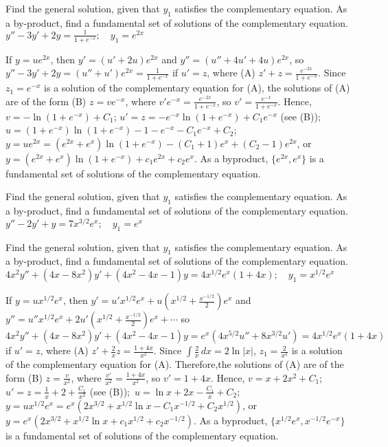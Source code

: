 \documentclass{ximera}
\begin{document}
\begin{problem}\label{exer:5.6.4}
Find the general solution,
given that $y_1$ satisfies the complementary equation. As a by-product,
find a fundamental set of solutions of the complementary equation. $y''-3y'+2y=\frac{1}{1+e^{-x}};   \quad y_1=e^{2x}$

\begin{solution}
    If $y=ue^{2x}$, then $y'=(u'+2u)e^{2x}$ and $y''=(u''+4u'+4u)e^{2x}$,
so $y''-3y'+2y=(u''+u')e^{2x}=\frac{1}{1+e^{-x}}$ if $u'=z$, where
(A) $z'+z=\frac{e^{-2x}}{1+e^{-x}}$. Since $z_1=e^{-x}$ is a
solution of the complementary equation for (A), the solutions of (A)
are of the form (B) $z=ve^{-x}$, where
$v'e^{-x}=\frac{e^{-2x}}{1+e^{-x}}$, so
$v'=\frac{e^{-x}}{1+e^{-x}}$. Hence, $v=-\ln(1+e^{-x})+C_1$;\;
$u'=z=-e^{-x}\ln(1+e^{-x})+C_1e^{-x}$ (see (B));\;
$u=(1+e^{-x})\ln(1+e^{-x})-1-e^{-x}-C_1e^{-x}+C_2$;\;
$y=ue^{2x}=(e^{2x}+e^x)\ln(1+e^{-x})-(C_1+1)e^x+(C_2-1)e^{2x}$, or
$y=(e^{2x}+e^x) \ln (1+e^{-x})+c_1e^{2x}+c_2e^x$. As a byproduct,
$\{e^{2x},e^x\}$ is a fundamental set of solutions of the
complementary equation.
\end{solution}
\end{problem}

\begin{problem}\label{exer:5.6.5}
Find the general solution,
given that $y_1$ satisfies the complementary equation. As a by-product,
find a fundamental set of solutions of the complementary equation. $y''-2y'+y=7x^{3/2}e^x;   \quad y_1=e^x$
\end{problem}

\begin{problem}\label{exer:5.6.6}
Find the general solution,
given that $y_1$ satisfies the complementary equation. As a by-product,
find a fundamental set of solutions of the complementary equation. $4x^2y''+(4x-8x^2)y'+(4x^2-4x-1)y=4x^{1/2}e^x(1+4x);   \quad
y_1=x^{1/2}e^x$

\begin{solution}
    If $y=ux^{1/2}e^x$, then
$y'=u'x^{1/2}e^x+u{\left(x^{1/2}+\frac{x^{-1/2}}{2}\right)}e^x$ and
$y''=u''x^{1/2}e^x+2u'{\left(x^{1/2}+\frac{x^{-1/2}}{2}\right)}e^x+\cdots$
so $4x^2y''+(4x-8x^2)y'+(4x^2-4x-1)y=e^x(4x^{5/2}u''+8x^{3/2}u')
=4x^{1/2}e^x(1+4x)$ if $u'=z$, where (A) $z'+\frac{2}{
x}z=\frac{1+4x}{ x^2}$. Since ${\int\frac{2}{ x}\,dx}=
2\ln|x|$, $z_1=\frac{2}{ x^2}$ is a solution of the complementary
equation for (A). Therefore,the solutions of (A) are of the form (B)
$z=\frac{v}{ x^2}$, where $\frac{v'}{ x^2}=\frac{1+4x}{ x^2}$,
so $v'=1+4x$. Hence, $v=x+2x^2+C_1$;\ $u'=z=\frac{1}{
x}+2+\frac{C_1}{ x^2}$ (see (B));\ $u=\ln x+2x-\frac{C_1}{
x}+C_2$;\ $y=ux^{1/2}e^x=e^x(2x^{3/2}+x^{1/2}\ln
x-C_1x^{-1/2}+C_2x^{1/2})$, or $y=e^x(2x^{3/2}+x^{1/2}\ln
x+c_1x^{1/2}+c_2x^{-1/2})$. As a byproduct,
$\{x^{1/2}e^x,x^{-1/2}e^{-x}\}$ is a fundamental set of solutions of
the complementary equation.
\end{solution}
\end{problem}
\end{document}
